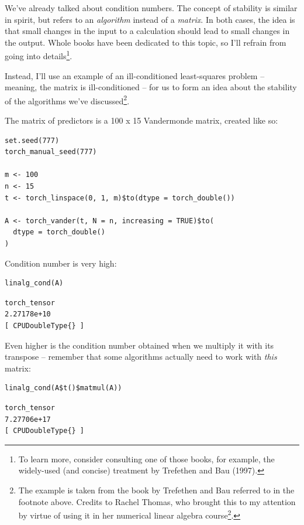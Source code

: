 \documentclass[
  letterpaper,
]{krantz}
\DeclareRobustCommand{\href}[2]{#2\footnote{\url{#1}}}
\begin{document}
We've already talked about condition numbers. The concept of stability
is similar in spirit, but refers to an \emph{algorithm} instead of a
\emph{matrix}. In both cases, the idea is that small changes in the
input to a calculation should lead to small changes in the output. Whole
books have been dedicated to this topic, so I'll refrain from going into
details\footnote{To learn more, consider consulting one of those books,
  for example, the widely-used (and concise) treatment by Trefethen and
  Bau (1997).}.

Instead, I'll use an example of an ill-conditioned least-squares problem
-- meaning, the matrix is ill-conditioned -- for us to form an idea
about the stability of the algorithms we've discussed\footnote{The
  example is taken from the book by Trefethen and Bau referred to in the
  footnote above. Credits to Rachel Thomas, who brought this to my
  attention by virtue of using it in her
  \href{https://github.com/fastai/numerical-linear-algebra}{numerical
  linear algebra course}.}.

The matrix of predictors is a 100 x 15 Vandermonde matrix, created like
so:

\begin{verbatim}
set.seed(777)
torch_manual_seed(777)

m <- 100
n <- 15
t <- torch_linspace(0, 1, m)$to(dtype = torch_double())

A <- torch_vander(t, N = n, increasing = TRUE)$to(
  dtype = torch_double()
)
\end{verbatim}

Condition number is very high:

\begin{verbatim}
linalg_cond(A)
\end{verbatim}

\begin{verbatim}
torch_tensor
2.27178e+10
[ CPUDoubleType{} ]
\end{verbatim}

Even higher is the condition number obtained when we multiply it with
its transpose -- remember that some algorithms actually need to work
with \emph{this} matrix:

\begin{verbatim}
linalg_cond(A$t()$matmul(A))
\end{verbatim}

\begin{verbatim}
torch_tensor
7.27706e+17
[ CPUDoubleType{} ]
\end{verbatim}
\end{document}
